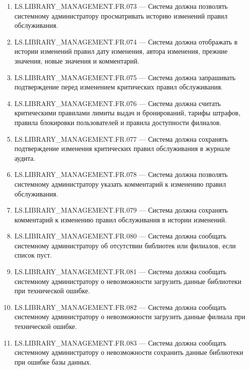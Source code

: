\documentclass[12pt,a4paper]{article}
\begin{document}
\begin{enumerate}
		\item LS.LIBRARY\_MANAGEMENT.FR.073 --- Система должна позволять системному
		администратору просматривать историю изменений правил обслуживания.
		
		\item LS.LIBRARY\_MANAGEMENT.FR.074 --- Система должна отображать в истории
		изменений правил дату изменения, автора изменения, прежние значения, новые
		значения и комментарий.
		
		\item LS.LIBRARY\_MANAGEMENT.FR.075 --- Система должна запрашивать подтверждение
		перед изменением критических правил обслуживания.
		
		\item LS.LIBRARY\_MANAGEMENT.FR.076 --- Система должна считать критическими
		правилами лимиты выдач и бронирований, тарифы штрафов, правила блокировки
		пользователей и правила доступности филиалов.
		
		\item LS.LIBRARY\_MANAGEMENT.FR.077 --- Система должна сохранять подтверждение
		изменения критических правил обслуживания в журнале аудита.
		
		\item LS.LIBRARY\_MANAGEMENT.FR.078 --- Система должна позволять системному
		администратору указать комментарий к изменению правил обслуживания.
		
		\item LS.LIBRARY\_MANAGEMENT.FR.079 --- Система должна сохранять комментарий
		к изменению правил обслуживания в истории изменений.
		
		\item LS.LIBRARY\_MANAGEMENT.FR.080 --- Система должна сообщать системному
		администратору об отсутствии библиотек или филиалов, если список пуст.
		
		\item LS.LIBRARY\_MANAGEMENT.FR.081 --- Система должна сообщать системному
		администратору о невозможности загрузить данные библиотеки при технической
		ошибке.
		
		\item LS.LIBRARY\_MANAGEMENT.FR.082 --- Система должна сообщать системному
		администратору о невозможности загрузить данные филиала при технической
		ошибке.
		
		\item LS.LIBRARY\_MANAGEMENT.FR.083 --- Система должна сообщать системному
		администратору о невозможности сохранить данные библиотеки при ошибке базы
		данных.
		

\end{enumerate}
\end{document}
